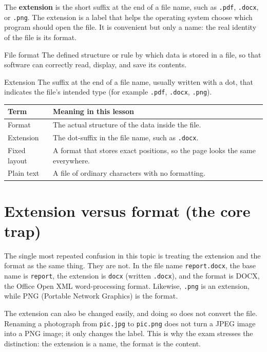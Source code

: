 The \textbf{extension} is the short suffix at the end of a file name, such as
\texttt{.pdf}, \texttt{.docx}, or \texttt{.png}. The extension is a label
that helps the operating system choose which program should open the file.
It is convenient but only a name: the real identity of the file is its format.

\begin{definitionbox}{File format}
The defined structure or rule by which data is stored in a file, so that
software can correctly read, display, and save its contents.
\end{definitionbox}

\begin{definitionbox}{Extension}
The suffix at the end of a file name, usually written with a dot, that
indicates the file's intended type (for example \texttt{.pdf}, \texttt{.docx},
\texttt{.png}).
\end{definitionbox}

\begin{center}
\begin{tabular}{p{}p{}}
\toprule
\textbf{Term} & \textbf{Meaning in this lesson} \\
\midrule
Format & The actual structure of the data inside the file. \\
Extension & The dot-suffix in the file name, such as \texttt{.docx}. \\
Fixed layout & A format that stores exact positions, so the page looks the same everywhere. \\
Plain text & A file of ordinary characters with no formatting. \\
\bottomrule
\end{tabular}
\end{center}

\section{Extension versus format (the core trap)}
The single most repeated confusion in this topic is treating the extension and
the format as the same thing. They are not. In the file name
\texttt{report.docx}, the base name is \texttt{report}, the extension is
\texttt{docx} (written \texttt{.docx}), and the format is DOCX, the Office
Open XML word-processing format. Likewise, \texttt{.png} is an extension,
while PNG (Portable Network Graphics) is the format.

The extension can also be changed easily, and doing so does not convert the
file. Renaming a photograph from \texttt{pic.jpg} to \texttt{pic.png} does
not turn a JPEG image into a PNG image; it only changes the label. This is
why the exam stresses the distinction: the extension is a name, the format is
the content.

